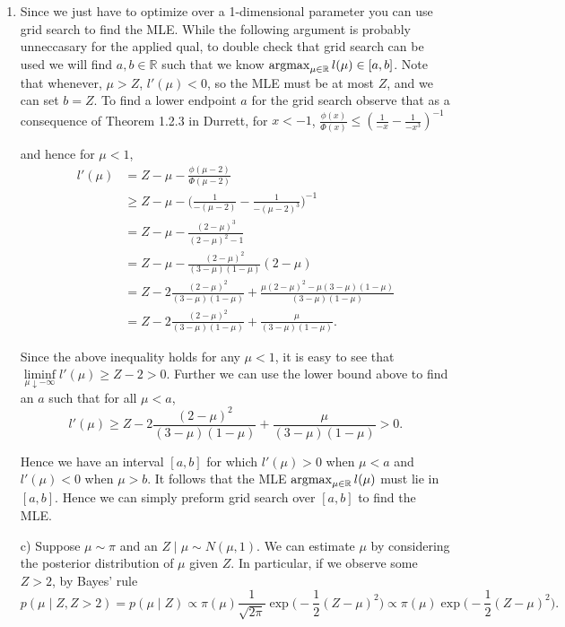 \begin{enumerate}[label=(\alph*)]
\item Since we just have to optimize over a 1-dimensional parameter you can use grid search to find the MLE. While the following argument is probably unneccasary for the applied qual, to double check that grid search can be used we will find $a, b \in \mathbb{R}$ such that we know $\operatorname*{argmax}_{\mu \in \mathbb{R}} l(\mu) \in [a,b]$. Note that whenever, $\mu > Z$, $l'(\mu) <0$, so the MLE must be at most $Z$, and we can set $b=Z$. To find a lower endpoint $a$ for the grid search observe that as a consequence of Theorem 1.2.3 in Durrett, for $x<-1$, $\frac{\phi(x)}{\Phi(x)} \leq (\frac{1}{-x} -\frac{1}{-x^3} )^{-1}$

and hence for $\mu < 1$,
$$\begin{aligned}
l'(\mu) & = Z - \mu - \frac{\phi(\mu-2)}{\Phi(\mu -2)}
\\ & \geq Z - \mu -  \Big(\frac{1}{-(\mu-2)} -\frac{1}{-(\mu-2)^3} \Big)^{-1}
\\ & = Z - \mu - \frac{(2-\mu)^3}{(2-\mu)^2 -1 }
\\ & = Z - \mu - \frac{(2-\mu)^2}{(3-\mu) (1-\mu) } (2-\mu)
\\ & = Z -2 \frac{(2-\mu)^2}{(3 -\mu) (1-\mu)} + \frac{\mu(2-\mu)^2 -\mu (3-\mu) (1-\mu)}{ (3-\mu) (1-\mu)}
\\ & = Z -2 \frac{(2-\mu)^2}{(3 -\mu) (1-\mu)} + \frac{\mu }{ (3-\mu) (1-\mu)}.
\end{aligned}$$

Since the above inequality holds for any $\mu < 1$, it is easy to see that $\liminf\limits_{\mu \downarrow - \infty} l'(\mu) \geq Z-2 >0$. Further we can use the lower bound above to find an $a$ such that for all $\mu < a$, $$ l'(\mu) \geq Z -2 \frac{(2-\mu)^2}{(3 -\mu) (1-\mu)} + \frac{\mu }{ (3-\mu) (1-\mu)} >0.$$

Hence we have an interval $[a,b]$ for which $l'(\mu) >0$ when $\mu <a$ and $l'(\mu) <0$ when $\mu>b$. It follows that the MLE $\operatorname*{argmax}_{\mu \in \mathbb{R}} l(\mu)$ must lie in $[a,b]$. Hence we can simply preform grid search over $[a,b]$ to find the MLE.

\item[c)] Suppose $\mu \sim \pi$ and an $Z \mid \mu  \sim N(\mu,1)$.
We can estimate $\mu$ by considering the posterior distribution of $\mu$ given $Z$. In particular, if we observe some $Z >2$, by Bayes' rule $$p(\mu \mid Z, Z>2 ) = p(\mu \mid Z) \propto \pi(\mu) \frac{1}{\sqrt{2 \pi}} \exp \big( -\frac{1}{2} (Z-\mu)^2 \big) \propto  \pi(\mu)  \exp \big( -\frac{1}{2} (Z-\mu)^2 \big).$$


\end{enumerate}
